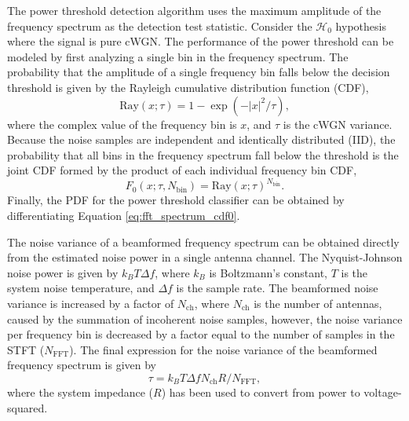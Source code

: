 The power threshold detection algorithm uses the maximum amplitude of the frequency spectrum as the detection test statistic. Consider the $\mathcal{H}_0$ hypothesis where the signal is pure cWGN. The performance of the power threshold can be modeled by first analyzing a single bin in the frequency spectrum. The probability that the amplitude of a single frequency bin falls below the decision threshold is given by the Rayleigh cumulative distribution function (CDF),
\begin{equation}
    \mathrm{Ray}(x;\tau)=1-\exp{\left(-|x|^2/\tau\right)},
\end{equation}
where the complex value of the frequency bin is $x$, and $\tau$ is the cWGN variance. Because the noise samples are independent and identically distributed (IID), the probability that all bins in the frequency spectrum fall below the threshold is the joint CDF formed by the product of each individual frequency bin CDF,
\begin{equation}
    F_0(x;\tau, N_\mathrm{bin})=\mathrm{Ray}(x;\tau)^{N_\textrm{bin}}.
    \label{eq:fft_spectrum_cdf0}
\end{equation}
Finally, the PDF for the power threshold classifier can be obtained by differentiating Equation \ref{eq:fft_spectrum_cdf0}.

The noise variance of a beamformed frequency spectrum can be obtained directly from the estimated noise power in a single antenna channel. The Nyquist-Johnson noise power is given by $k_BT\Delta f$, where $k_B$ is Boltzmann's constant, $T$ is the system noise temperature, and $\Delta f$ is the sample rate. The beamformed noise variance is increased by a factor of $N_\textrm{ch}$, where $N_\textrm{ch}$ is the number of antennas, caused by the summation of incoherent noise samples, however, the noise variance per frequency bin is decreased by a factor equal to the number of samples in the STFT ($N_\textrm{FFT}$). The final expression for the noise variance of the beamformed frequency spectrum is given by 
\begin{equation}
    \tau = k_BT\Delta fN_\textrm{ch}R/N_\textrm{FFT},
\end{equation}
where the system impedance ($R$) has been used to convert from power to voltage-squared. 


